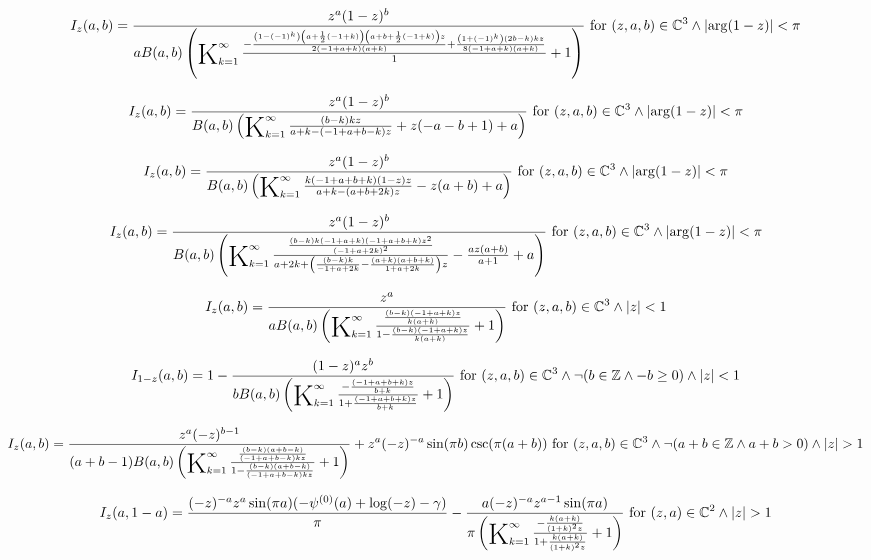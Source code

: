 \documentclass{article}
\newcommand{\bigK}{\mathop{\raisebox{-5pt}{\huge K}}}
\begin{document}
\[I_z(a,b)=\frac{z^a (1-z)^b}{a B(a,b) \left(\bigK_{k=1}^{\infty}\frac{-\frac{\left(1-(-1)^k\right) \left(a+\frac{1}{2} (-1+k)\right) \left(a+b+\frac{1}{2} (-1+k)\right) z}{2 (-1+a+k) (a+k)}+\frac{\left(1+(-1)^k\right) (2 b-k) k z}{8 (-1+a+k) (a+k)}}{1}+1\right)}\text{ for }(z,a,b)\in \mathbb{C}^3\land \left| \arg (1-z)\right| <\pi\] 

\[I_z(a,b)=\frac{z^a (1-z)^b}{B(a,b) \left(\bigK_{k=1}^{\infty}\frac{(b-k) k z}{a+k-(-1+a+b-k) z}+z (-a-b+1)+a\right)}\text{ for }(z,a,b)\in \mathbb{C}^3\land \left| \arg (1-z)\right| <\pi\] 

\[I_z(a,b)=\frac{z^a (1-z)^b}{B(a,b) \left(\bigK_{k=1}^{\infty}\frac{k (-1+a+b+k) (1-z) z}{a+k-(a+b+2 k) z}-z (a+b)+a\right)}\text{ for }(z,a,b)\in \mathbb{C}^3\land \left| \arg (1-z)\right| <\pi\] 

\[I_z(a,b)=\frac{z^a (1-z)^b}{B(a,b) \left(\bigK_{k=1}^{\infty}\frac{\frac{(b-k) k (-1+a+k) (-1+a+b+k) z^2}{(-1+a+2 k)^2}}{a+2 k+\left(\frac{(b-k) k}{-1+a+2 k}-\frac{(a+k) (a+b+k)}{1+a+2 k}\right) z}-\frac{a z (a+b)}{a+1}+a\right)}\text{ for }(z,a,b)\in \mathbb{C}^3\land \left| \arg (1-z)\right| <\pi\] 

\[I_z(a,b)=\frac{z^a}{a B(a,b) \left(\bigK_{k=1}^{\infty}\frac{\frac{(b-k) (-1+a+k) z}{k (a+k)}}{1-\frac{(b-k) (-1+a+k) z}{k (a+k)}}+1\right)}\text{ for }(z,a,b)\in \mathbb{C}^3\land \left| z\right| <1\] 

\[I_{1-z}(a,b)=1-\frac{(1-z)^a z^b}{b B(a,b) \left(\bigK_{k=1}^{\infty}\frac{-\frac{(-1+a+b+k) z}{b+k}}{1+\frac{(-1+a+b+k) z}{b+k}}+1\right)}\text{ for }(z,a,b)\in \mathbb{C}^3\land \neg (b\in \mathbb{Z}\land -b\geq 0)\land \left| z\right| <1\] 

\[I_z(a,b)=\frac{z^a (-z)^{b-1}}{(a+b-1) B(a,b) \left(\bigK_{k=1}^{\infty}\frac{\frac{(b-k) (a+b-k)}{(-1+a+b-k) k z}}{1-\frac{(b-k) (a+b-k)}{(-1+a+b-k) k z}}+1\right)}+z^a (-z)^{-a} \sin (\pi  b) \csc (\pi  (a+b))\text{ for }(z,a,b)\in \mathbb{C}^3\land \neg (a+b\in \mathbb{Z}\land a+b>0)\land \left| z\right| >1\] 

\[I_z(a,1-a)=\frac{(-z)^{-a} z^a \sin (\pi  a) (-\psi ^{(0)}(a)+\log (-z)-\gamma )}{\pi }-\frac{a (-z)^{-a} z^{a-1} \sin (\pi  a)}{\pi  \left(\bigK_{k=1}^{\infty}\frac{-\frac{k (a+k)}{(1+k)^2 z}}{1+\frac{k (a+k)}{(1+k)^2 z}}+1\right)}\text{ for }(z,a)\in \mathbb{C}^2\land \left| z\right| >1\] 
\end{document}
